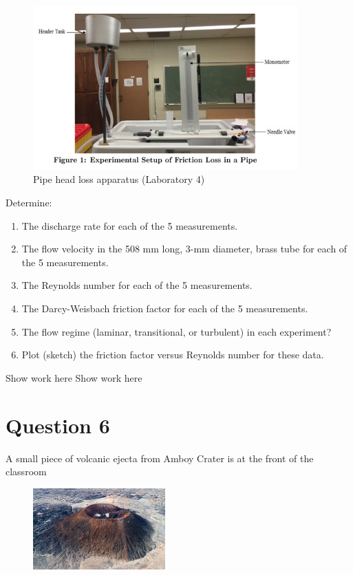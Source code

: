 \documentclass[12pt]{article}
\begin{document}
\begin{figure}[h!] %
   \centering
   \includegraphics[width=4in]{labsetup.png} 
   \caption{Pipe head loss apparatus (Laboratory 4)}
   \label{fig:labsetup}
\end{figure}

Determine:
\begin{enumerate}
\item The discharge rate for each of the 5 measurements.
\item The flow velocity in the 508 mm long, 3-mm diameter, brass tube for each of the 5 measurements.
\item The Reynolds number for each of the 5 measurements.
\item The Darcy-Weisbach friction factor for each of the 5 measurements.
\item The flow regime (laminar, transitional, or turbulent) in each experiment?
\item Plot (sketch) the friction factor versus Reynolds number for these data.
\end{enumerate}
\clearpage
Show work here
\clearpage
Show work here
\clearpage
\section*{Question 6}
A small piece of volcanic ejecta from Amboy Crater is at the front of
the classroom

\begin{figure}[htbp] %
   \centering
\includegraphics[width=2in]{amboy.png}
\end{figure}
\end{document}
